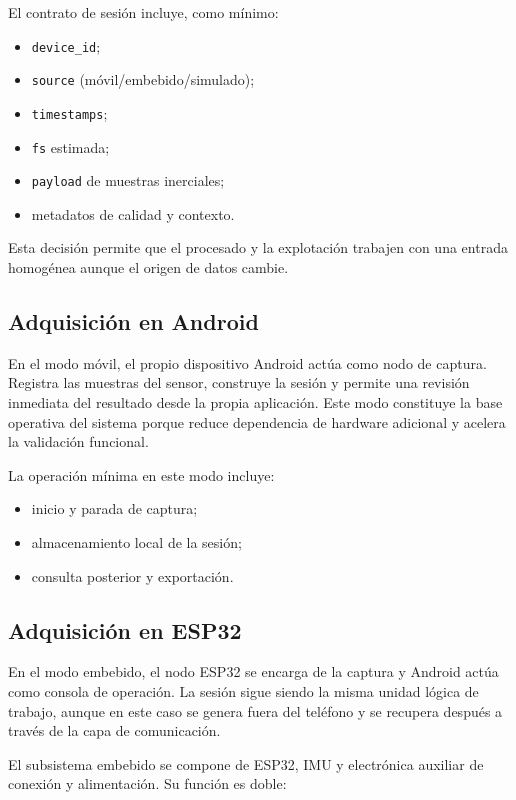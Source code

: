 El contrato de sesión incluye, como mínimo:

\begin{itemize}
  \item \texttt{device\_id};
  \item \texttt{source} (móvil/embebido/simulado);
  \item \texttt{timestamps};
  \item \texttt{fs} estimada;
  \item \texttt{payload} de muestras inerciales;
  \item metadatos de calidad y contexto.
\end{itemize}

Esta decisión permite que el procesado y la explotación trabajen con una entrada homogénea aunque el origen de datos cambie.

\subsection{Adquisición en Android}

En el modo móvil, el propio dispositivo Android actúa como nodo de captura. Registra las muestras del sensor, construye la sesión y permite una revisión inmediata del resultado desde la propia aplicación. Este modo constituye la base operativa del sistema porque reduce dependencia de hardware adicional y acelera la validación funcional.

La operación mínima en este modo incluye:

\begin{itemize}
  \item inicio y parada de captura;
  \item almacenamiento local de la sesión;
  \item consulta posterior y exportación.
\end{itemize}

\subsection{Adquisición en ESP32}

En el modo embebido, el nodo ESP32 se encarga de la captura y Android actúa como consola de operación. La sesión sigue siendo la misma unidad lógica de trabajo, aunque en este caso se genera fuera del teléfono y se recupera después a través de la capa de comunicación.

El subsistema embebido se compone de ESP32, IMU y electrónica auxiliar de conexión y alimentación. Su función es doble:

